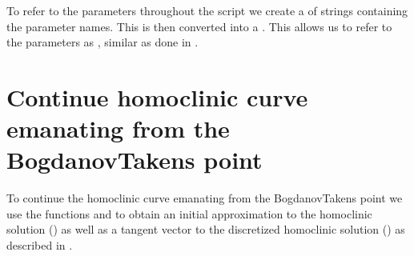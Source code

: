 \documentclass[letterpaper,10pt,english]{jupyterBook}
\begin{document}
\sphinxAtStartPar
To refer to the parameters throughout the script we create a  of
strings containing the parameter names. This is then converted into a
. This allows us to refer to the parameters as ,
similar as done in .

\begin{sphinxVerbatim}[commandchars=\\\{\}]
\PYG{p}{[}\PYG{p}{]}
\end{sphinxVerbatim}


\section{Continue homoclinic curve emanating from the Bogdanov\sphinxhyphen{}Takens point}
\label{\detokenize{extendedLorenz84model:continue-homoclinic-curve-emanating-from-the-bogdanov-takens-point}}
\sphinxAtStartPar
To continue the homoclinic curve emanating from the Bogdanov\sphinxhyphen{}Takens point we
use the functions  and  to obtain an initial
approximation to the homoclinic solution () as well as a tangent vector
to the discretized homoclinic solution () as described in
{\hyperref[\detokenize{Morris-Lecar:initial-prediction-homoclinic-orbit}]{}}.
\end{document}
